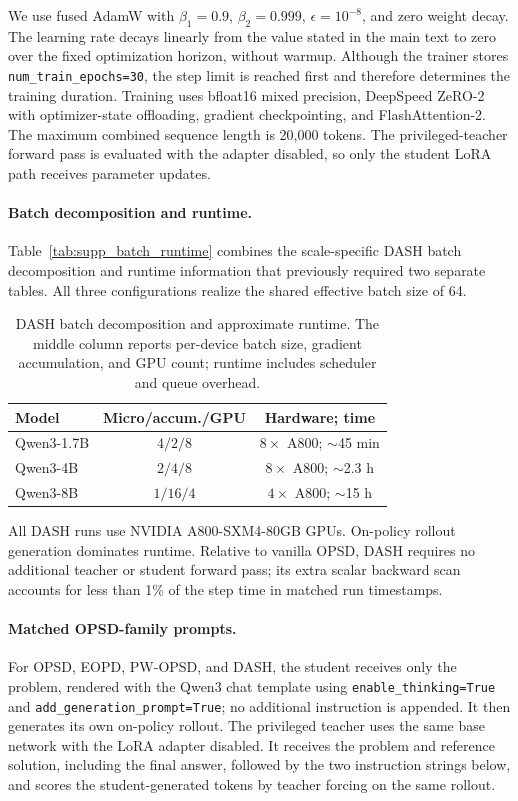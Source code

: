 \documentclass[letterpaper]{article} %
\begin{document}
We use fused AdamW with $\beta_1=0.9$, $\beta_2=0.999$,
$\epsilon=10^{-8}$, and zero weight decay. The learning rate decays
linearly from the value stated in the main text to zero over the fixed
optimization horizon, without warmup. Although the trainer stores
\texttt{num\_train\_epochs=30}, the step limit is reached first and
therefore determines the training duration. Training uses bfloat16
mixed precision, DeepSpeed ZeRO-2 with optimizer-state offloading,
gradient checkpointing, and FlashAttention-2. The maximum combined
sequence length is 20,000 tokens. The privileged-teacher forward pass
is evaluated with the adapter disabled, so only the student LoRA path
receives parameter updates.

\paragraph{Batch decomposition and runtime.}
Table~\ref{tab:supp_batch_runtime} combines the scale-specific DASH batch
decomposition and runtime information that previously required two
separate tables. All three configurations realize the shared effective
batch size of 64.

\begin{table}[!htbp]
\centering
\footnotesize
\setlength{\tabcolsep}{3.5pt}
\begin{tabular}{@{}lcc@{}}
\toprule
\textbf{Model} & \textbf{Micro/accum./GPU} & \textbf{Hardware; time} \\
\midrule
Qwen3-1.7B & $4/2/8$  & $8\times$ A800; $\sim$45 min \\
Qwen3-4B   & $2/4/8$  & $8\times$ A800; $\sim$2.3 h \\
Qwen3-8B   & $1/16/4$ & $4\times$ A800; $\sim$15 h \\
\bottomrule
\end{tabular}
\caption{DASH batch decomposition and approximate runtime. The middle
column reports per-device batch size, gradient accumulation, and GPU
count; runtime includes scheduler and queue overhead.}
\label{tab:supp_batch_runtime}
\label{tab:supp_batch_decomposition}
\label{tab:supp_runtime}
\end{table}

All DASH runs use NVIDIA A800-SXM4-80GB GPUs. On-policy rollout generation
dominates runtime. Relative to vanilla OPSD, DASH requires no additional
teacher or student forward pass; its extra scalar backward scan accounts
for less than 1\% of the step time in matched run timestamps.

\paragraph{Matched OPSD-family prompts.}
For OPSD, EOPD, PW-OPSD, and DASH, the student receives only the
problem, rendered with the Qwen3 chat
template using \texttt{enable\_thinking=True} and
\texttt{add\_generation\_prompt=True}; no additional instruction is
appended. It then generates its own on-policy rollout. The privileged
teacher uses the same base network with the LoRA adapter disabled. It
receives the problem and reference solution, including the final
answer, followed by the two instruction strings below, and scores the
student-generated tokens by teacher forcing on the same rollout.
\end{document}

